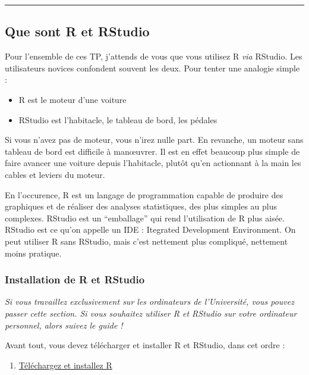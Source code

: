 \documentclass[a4paperpaper,]{article}
\providecommand{\tightlist}{%
  \setlength{\itemsep}{0pt}\setlength{\parskip}{0pt}}
\theoremstyle{definition}
\theoremstyle{definition}
\theoremstyle{definition}
\theoremstyle{remark}
\begin{document}
\begin{center}\rule{0.5\linewidth}{\linethickness}\end{center}

\hypertarget{que-sont-r-et-rstudio}{%
\subsection{Que sont R et RStudio}\label{que-sont-r-et-rstudio}}

Pour l'ensemble de ces TP, j'attends de vous que vous utilisez R
\emph{via} RStudio. Les utilisateurs novices confondent souvent les
deux. Pour tenter une analogie simple :

\begin{itemize}
\tightlist
\item
  R est le moteur d'une voiture
\item
  RStudio est l'habitacle, le tableau de bord, les pédales
\end{itemize}

Si vous n'avez pas de moteur, vous n'irez nulle part. En revanche, un
moteur sans tableau de bord est difficile à manœuvrer. Il est en effet
beaucoup plus simple de faire avancer une voiture depuis l'habitacle,
plutôt qu'en actionnant à la main les cables et leviers du moteur.

En l'occurence, R est un langage de programmation capable de produire
des graphiques et de réaliser des analyses statistiques, des plus
simples au plus complexes. RStudio est un ``emballage'' qui rend
l'utilisation de R plus aisée. RStudio est ce qu'on appelle un IDE :
Itegrated Development Environment. On peut utiliser R sans RStudio, mais
c'est nettement plus compliqué, nettement moins pratique.

\hypertarget{installation-de-r-et-rstudio}{%
\subsubsection{Installation de R et
RStudio}\label{installation-de-r-et-rstudio}}

\emph{Si vous travaillez exclusivement sur les ordinateurs de
l'Université, vous pouvez passer cette section. Si vous souhaitez
utiliser R et RStudio sur votre ordinateur personnel, alors suivez le
guide !}

Avant tout, vous devez télécharger et installer R et RStudio, dans cet
ordre :

\begin{enumerate}
\def\labelenumi{\arabic{enumi}.}
\tightlist
\item
  \href{https://cran.r-project.org}{Téléchargez et installez R}
\end{enumerate}
\end{document}
